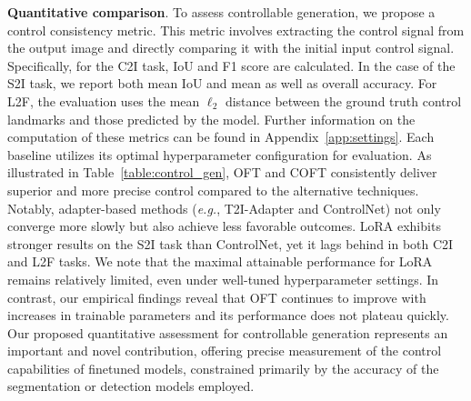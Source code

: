 \textbf{Quantitative comparison}. To assess controllable generation, we propose a control consistency metric. This metric involves extracting the control signal from the output image and directly comparing it with the initial input control signal. Specifically, for the C2I task, IoU and F1 score are calculated. In the case of the S2I task, we report both mean IoU and mean as well as overall accuracy. For L2F, the evaluation uses the mean $\ell_2$ distance between the ground truth control landmarks and those predicted by the model. Further information on the computation of these metrics can be found in Appendix~\ref{app:settings}. Each baseline utilizes its optimal hyperparameter configuration for evaluation. As illustrated in Table~\ref{table:control_gen}, OFT and COFT consistently deliver superior and more precise control compared to the alternative techniques. Notably, adapter-based methods (\emph{e.g.}, T2I-Adapter and ControlNet) not only converge more slowly but also achieve less favorable outcomes. LoRA exhibits stronger results on the S2I task than ControlNet, yet it lags behind in both C2I and L2F tasks. We note that the maximal attainable performance for LoRA remains relatively limited, even under well-tuned hyperparameter settings. In contrast, our empirical findings reveal that OFT continues to improve with increases in trainable parameters and its performance does not plateau quickly. Our proposed quantitative assessment for controllable generation represents an important and novel contribution, offering precise measurement of the control capabilities of finetuned models, constrained primarily by the accuracy of the segmentation or detection models employed.

